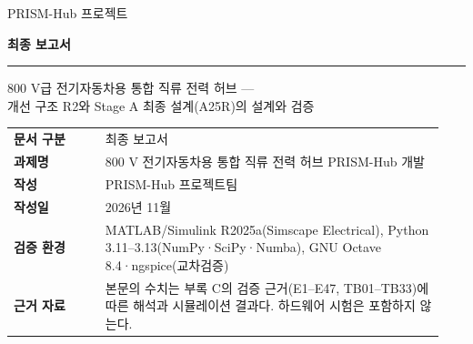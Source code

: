 \begin{titlepage}
\thispagestyle{empty}
\vspace*{30mm}
{\sffamily\color{prismblue}
{\Large PRISM-Hub 프로젝트\par}
\vspace{4mm}
{\fontsize{30}{40}\selectfont\bfseries 최종 보고서\par}
\vspace{8mm}
\rule{\linewidth}{1pt}\par
\vspace{4mm}
{\large 800 V급 전기자동차용 통합 직류 전력 허브 ---\\[1mm]
개선 구조 R2와 Stage A 최종 설계(A25R)의 설계와 검증\par}
}
\vfill
{\small
\renewcommand{\arraystretch}{1.5}
\begin{tabular}{@{}L{0.2\linewidth}L{0.74\linewidth}@{}}
\toprule
\textbf{문서 구분} & 최종 보고서 \\
\textbf{과제명} & 800 V 전기자동차용 통합 직류 전력 허브 PRISM-Hub 개발 \\
\textbf{작성} & PRISM-Hub 프로젝트팀 \\
\textbf{작성일} & 2026년 11월 \\
\textbf{검증 환경} & MATLAB/Simulink R2025a(Simscape Electrical), Python 3.11–3.13(NumPy·SciPy·Numba), GNU Octave 8.4·ngspice(교차검증) \\
\textbf{근거 자료} & 본문의 수치는 부록 C의 검증 근거(E1–E47, TB01–TB33)에 따른 해석과 시뮬레이션 결과다. 하드웨어 시험은 포함하지 않는다. \\
\bottomrule
\end{tabular}
}
\vspace{10mm}
\end{titlepage}
